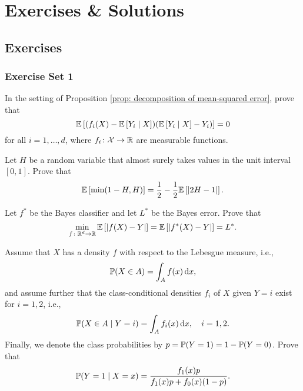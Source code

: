 \part{Exercises \& Solutions}

\chapter{Exercises}

\section{Exercise Set 1}

\begin{exercise}
In the setting of Proposition \ref{prop: decomposition of mean-squared error}, prove that
\[
    \Ex{(f_i(X) - \Ex{Y_i \given X}) (\Ex{Y_i \given X} - Y_i)} = 0
\]
for all $i = 1, \dots, d$, where $f_i \colon \mathcal{X} \to \R$ are measurable functions.
\end{exercise}


\begin{exercise}
Let $H$ be a random variable that almost surely takes values in the unit interval $[0, 1]$. Prove that
\[
    \Ex{\min(1-H, H)} = \frac{1}{2} - \frac{1}{2}\Ex{\abs{2H - 1}}.
\]
\end{exercise}


\begin{exercise}
Let $f^*$ be the Bayes classifier and let $L^*$ be the Bayes error. Prove that
\[
    \min_{f \colon \R^d \to \R} \Ex{\abs{f(X) - Y}} = \Ex{\abs{f^*(X) - Y}} = L^*.
\]
\end{exercise}


\begin{exercise}
Assume that $X$ has a density $f$ with respect to the Lebesgue measure, i.e.,
\[
    \P(X \in A) = \int_A f(x) \dx,
\]
and assume further that the class-conditional densities $f_i$ of $X$ given $Y = i$ exist for $i = 1, 2$, i.e.,
\[
    \P(X \in A \given Y = i) = \int_A f_i(x) \dx, \quad i = 1, 2.
\]
Finally, we denote the class probabilities by $p = \P(Y = 1) = 1 - \P(Y = 0)$. Prove that
\[
    \P(Y = 1 \given X = x) = \frac{f_1(x)p}{f_1(x)p + f_0(x) (1-p)}.
\]
\end{exercise}
